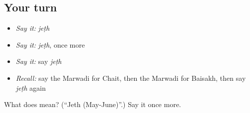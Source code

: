 \subsection*{Your turn}
\begin{itemize}
\raggedright
  \item \emph{Say it:} \emph{jeṭh}
  \item \emph{Say it:} \emph{jeṭh}, once more
  \item \emph{Say it:} say \emph{jeṭh}
  \item \emph{Recall:} say the Marwadi for Chait, then the Marwadi for Baisakh, then say \emph{jeṭh} again
\end{itemize}

\begin{tcolorbox}[breakable,colback=teal!4,colframe=teal!35!black,title={Before you move on}]
What does  mean? (\textquotedblleft{}Jeth (May-June)\textquotedblright{}.) Say it once more.
\end{tcolorbox}
